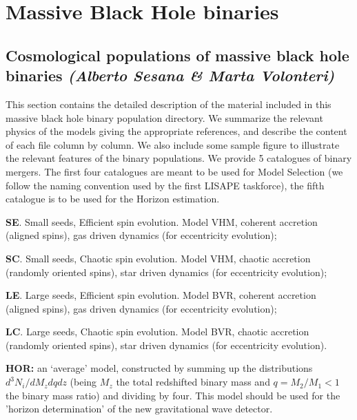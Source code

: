\documentclass{iopart}
\newenvironment{itemize_estret}{
\begin{itemize}
  \setlength{\itemsep}{1pt}
  \setlength{\parskip}{0pt}
  \setlength{\parsep}{0pt}
}{\end{itemize}}
\begin{document}

\section{ Massive Black Hole binaries}
\label{S:MBHb}





\subsection{Cosmological populations of massive black hole binaries {\it (Alberto Sesana \& Marta Volonteri) }}
\label{SS:MBHbPop}


This section contains the detailed description of the material included 
in this massive black hole binary population directory. We summarize the 
relevant physics of the models giving the appropriate references, and 
describe the content of each file column by column. We also include 
some sample figure to illustrate the relevant features of the binary 
populations. We provide 5 catalogues of binary mergers. The first four catalogues
are meant to be used for Model Selection (we follow the naming convention used by the 
first LISAPE taskforce), the fifth catalogue is to be used for the Horizon estimation. 
\begin{itemize_estret}
\item {\bf SE}. Small seeds, Efficient spin evolution. Model VHM, coherent accretion (aligned spins), gas 
driven dynamics (for eccentricity evolution); 
\item {\bf SC}. Small seeds, Chaotic spin evolution. Model VHM, chaotic accretion (randomly oriented spins), star 
driven dynamics (for eccentricity evolution); 
\item {\bf LE}. Large seeds, Efficient spin evolution. Model BVR, coherent accretion (aligned spins), gas 
driven dynamics (for eccentricity evolution); 
\item {\bf LC}. Large seeds, Chaotic spin evolution. Model BVR, chaotic accretion (randomly oriented spins), star 
driven dynamics (for eccentricity evolution). 
\item {\bf HOR:} an `average' model, constructed by summing up the distributions $d^3N_i/dM_zdqdz$ 
(being $M_z$ the total redshifted binary mass and $q=M_2/M_1<1$ 
the binary mass ratio)  and dividing by four. This model should be used for the 'horizon determination'
of the new gravitational wave detector.
\end{itemize_estret}
\end{document}
